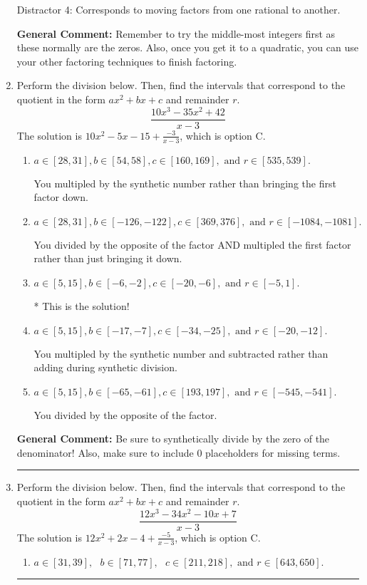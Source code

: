\documentclass{extbook}[14pt]
\newcommand{\litem}[1]{\item #1

\rule{\textwidth}{0.4pt}}
\begin{document}
\begin{enumerate}
{\begin{enumerate}[label=\Alph*.]
 Distractor 4: Corresponds to moving factors from one rational to another.
\end{enumerate}

\textbf{General Comment:} Remember to try the middle-most integers first as these normally are the zeros. Also, once you get it to a quadratic, you can use your other factoring techniques to finish factoring.
}
\litem{
Perform the division below. Then, find the intervals that correspond to the quotient in the form $ax^2+bx+c$ and remainder $r$.
\[ \frac{10x^{3} -35 x^{2} + 42}{x -3} \]The solution is \( 10x^{2} -5 x -15 + \frac{-3}{x -3} \), which is option C.\begin{enumerate}[label=\Alph*.]
\item \( a \in [28, 31], b \in [54, 58], c \in [160, 169], \text{ and } r \in [535, 539]. \)

 You multipled by the synthetic number rather than bringing the first factor down.
\item \( a \in [28, 31], b \in [-126, -122], c \in [369, 376], \text{ and } r \in [-1084, -1081]. \)

 You divided by the opposite of the factor AND multipled the first factor rather than just bringing it down.
\item \( a \in [5, 15], b \in [-6, -2], c \in [-20, -6], \text{ and } r \in [-5, 1]. \)

* This is the solution!
\item \( a \in [5, 15], b \in [-17, -7], c \in [-34, -25], \text{ and } r \in [-20, -12]. \)

 You multipled by the synthetic number and subtracted rather than adding during synthetic division.
\item \( a \in [5, 15], b \in [-65, -61], c \in [193, 197], \text{ and } r \in [-545, -541]. \)

 You divided by the opposite of the factor.
\end{enumerate}

\textbf{General Comment:} Be sure to synthetically divide by the zero of the denominator! Also, make sure to include 0 placeholders for missing terms.
}
\litem{
Perform the division below. Then, find the intervals that correspond to the quotient in the form $ax^2+bx+c$ and remainder $r$.
\[ \frac{12x^{3} -34 x^{2} -10 x + 7}{x -3} \]The solution is \( 12x^{2} +2 x -4 + \frac{-5}{x -3} \), which is option C.\begin{enumerate}[label=\Alph*.]
\item \( a \in [31, 39], \text{   } b \in [71, 77], \text{   } c \in [211, 218], \text{   and   } r \in [643, 650]. \)


\end{enumerate}}
\end{enumerate}
\end{document}
